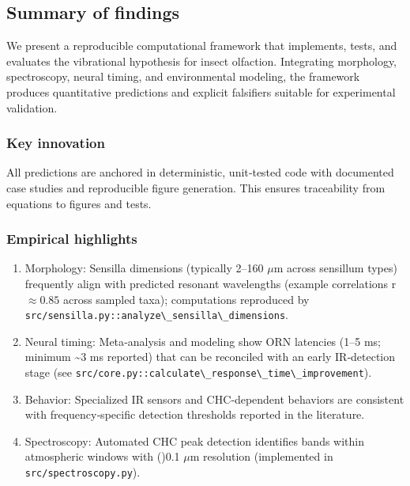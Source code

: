 \documentclass[
  13pt,
  a4paperpaper,
  12pt]{article}
\newcommand{\passthrough}[1]{#1}
\providecommand{\tightlist}{%
  \setlength{\itemsep}{0pt}\setlength{\parskip}{0pt}}
\begin{document}
\subsection{Summary of findings}\label{summary-of-findings}

We present a reproducible computational framework that implements,
tests, and evaluates the vibrational hypothesis for insect olfaction.
Integrating morphology, spectroscopy, neural timing, and environmental
modeling, the framework produces quantitative predictions and explicit
falsifiers suitable for experimental validation.

\subsubsection{Key innovation}\label{key-innovation}

All predictions are anchored in deterministic, unit‑tested code with
documented case studies and reproducible figure generation. This ensures
traceability from equations to figures and tests.

\subsubsection{Empirical highlights}\label{empirical-highlights}

\begin{enumerate}
\def\labelenumi{\arabic{enumi}.}
\tightlist
\item
  Morphology: Sensilla dimensions (typically 2--160 \(\mu\mathrm{m}\)
  across sensillum types) frequently align with predicted resonant
  wavelengths (example correlations r \(\approx 0.85\) across sampled
  taxa); computations reproduced by
  \passthrough{\lstinline!src/sensilla.py::analyze\_sensilla\_dimensions!}.
\item
  Neural timing: Meta‑analysis and modeling show ORN latencies (1--5 ms;
  minimum \textasciitilde3 ms reported) that can be reconciled with an
  early IR‑detection stage (see
  \passthrough{\lstinline!src/core.py::calculate\_response\_time\_improvement!}).
\item
  Behavior: Specialized IR sensors and CHC‑dependent behaviors are
  consistent with frequency‑specific detection thresholds reported in
  the literature.
\item
  Spectroscopy: Automated CHC peak detection identifies bands within
  atmospheric windows with (\pm)0.1 \(\mu\mathrm{m}\) resolution
  (implemented in \passthrough{\lstinline!src/spectroscopy.py!}).
\end{enumerate}
\end{document}
